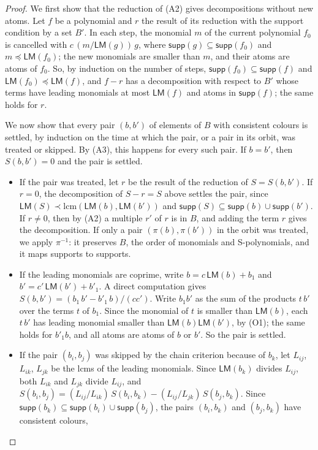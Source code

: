 \documentclass[12pt,a4paper,article]{memoir}
\newcommand{\supp}{\mathsf{supp}}
\newcommand{\LM}{\mathsf{LM}}
\theoremstyle{definition}
\begin{document}
\begin{proof}
We first show that the reduction of (A2) gives decompositions without new atoms.
Let $f$ be a polynomial and $r$ the result of its reduction with the support condition by a set $B'$.
In each step, the monomial $m$ of the current polynomial $f_0$ is cancelled with $c\,(m / \LM(g))\, g$,
where $\supp(g) \subseteq \supp(f_0)$ and $m \preceq \LM(f_0)$;
the new monomials are smaller than $m$, and their atoms are atoms of $f_0$.
So, by induction on the number of steps, $\supp(f_0) \subseteq \supp(f)$ and $\LM(f_0) \preceq \LM(f)$,
and $f - r$ has a decomposition with respect to $B'$ whose terms have leading monomials at most $\LM(f)$
and atoms in $\supp(f)$; the same holds for $r$.

We now show that every pair $(b, b')$ of elements of $B$ with consistent colours is settled,
by induction on the time at which the pair, or a pair in its orbit, was treated or skipped.
By (A3), this happens for every such pair.
If $b = b'$, then $S(b, b') = 0$ and the pair is settled.
\begin{itemize}
\item If the pair was treated, let $r$ be the result of the reduction of $S = S(b, b')$.
If $r = 0$, the decomposition of $S - r = S$ above settles the pair,
since $\LM(S) \prec \mathrm{lcm}(\LM(b), \LM(b'))$ and $\supp(S) \subseteq \supp(b) \cup \supp(b')$.
If $r \neq 0$, then by (A2) a multiple $r'$ of $r$ is in $B$, and adding the term $r$ gives the decomposition.
If only a pair $(\pi(b), \pi(b'))$ in the orbit was treated, we apply $\pi^{-1}$:
it preserves $B$, the order of monomials and S-polynomials, and it maps supports to supports.
\item If the leading monomials are coprime, write $b = c\,\LM(b) + b_1$ and $b' = c'\,\LM(b') + b'_1$.
A direct computation gives $S(b, b') = (b_1\, b' - b'_1\, b)/(c c')$.
Write $b_1 b'$ as the sum of the products $t\, b'$ over the terms $t$ of $b_1$.
Since the monomial of $t$ is smaller than $\LM(b)$, each $t\, b'$ has leading monomial smaller than $\LM(b)\LM(b')$, by (O1);
the same holds for $b'_1 b$, and all atoms are atoms of $b$ or $b'$. So the pair is settled.
\item If the pair $(b_i, b_j)$ was skipped by the chain criterion because of $b_k$,
let $L_{ij}$, $L_{ik}$, $L_{jk}$ be the lcms of the leading monomials.
Since $\LM(b_k)$ divides $L_{ij}$, both $L_{ik}$ and $L_{jk}$ divide $L_{ij}$, and
$S(b_i, b_j) = (L_{ij}/L_{ik})\, S(b_i, b_k) - (L_{ij}/L_{jk})\, S(b_j, b_k)$.
Since $\supp(b_k) \subseteq \supp(b_i) \cup \supp(b_j)$, the pairs $(b_i, b_k)$ and $(b_j, b_k)$ have consistent colours,

\end{itemize}
\end{proof}
\end{document}

